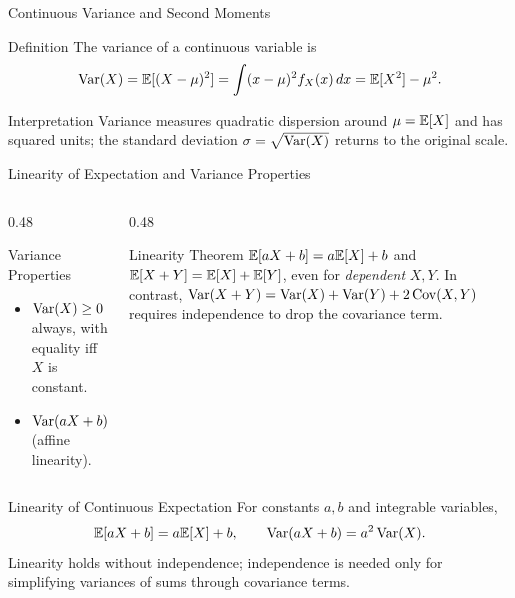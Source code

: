 \documentclass[aspectratio=169,xcolor={dvipsnames,table}]{beamer}
\begin{document}
\begin{frame}{Continuous Variance and Second Moments}
\scriptsize
\begin{block}{Definition}
The variance of a continuous variable is
\[
\operatorname{Var}(X)=\mathbb{E}[(X-\mu)^2]=\int (x-\mu)^2f_X(x)\,dx
       =\mathbb{E}[X^2]-\mu^2.
\]
\end{block}
\begin{alertblock}{Interpretation}
Variance measures quadratic dispersion around $\mu=\mathbb{E}[X]$ and has squared units;
the standard deviation $\sigma=\sqrt{\operatorname{Var}(X)}$ returns to the original scale.
\end{alertblock}
\end{frame}

\begin{frame}{Linearity of Expectation and Variance Properties}
	\vspace{-0.15cm}
	\begin{columns}[T]
		\begin{column}{0.48\textwidth}
			\begin{block}{Variance Properties}
				\footnotesize
				\begin{itemize}\itemsep=0.03cm
					\item $\operatorname{Var}(X) \ge 0$ always, with equality iff $X$ is constant.
					\item $\operatorname{Var}(aX + b) = a^{2} \operatorname{Var}(X)$ (affine linearity).
				\end{itemize}
			\end{block}
		\end{column}
		\begin{column}{0.48\textwidth}
			\begin{alertblock}{Linearity Theorem}
				\footnotesize
				$\mathbb{E}[aX+b] = a\mathbb{E}[X]+b$ and $\mathbb{E}[X+Y] = \mathbb{E}[X]+\mathbb{E}[Y]$, even for \emph{dependent} $X, Y$. In contrast, $\operatorname{Var}(X+Y) = \operatorname{Var}(X) + \operatorname{Var}(Y) + 2\operatorname{Cov}(X,Y)$ requires independence to drop the covariance term.
			\end{alertblock}
		\end{column}
	\end{columns}
\end{frame}

\begin{frame}{Linearity of Continuous Expectation}
\scriptsize
For constants $a,b$ and integrable variables,
\[
\mathbb{E}[aX+b]=a\mathbb{E}[X]+b,\qquad \operatorname{Var}(aX+b)=a^2\operatorname{Var}(X).
\]
Linearity holds without independence; independence is needed only for simplifying
variances of sums through covariance terms.
\end{frame}
\end{document}
